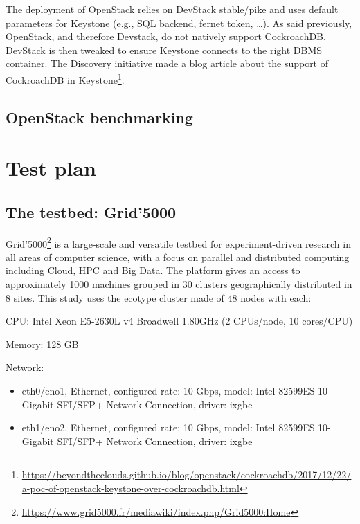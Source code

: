 The deployment of OpenStack relies on DevStack stable/pike and uses default parameters for Keystone (e.g., SQL backend, fernet token, \dots). As said previously, OpenStack, and therefore Devstack, do not natively support CockroachDB. DevStack is then tweaked to ensure Keystone connects to the right DBMS container. The Discovery initiative made a blog article about the support of CockroachDB in Keystone\footnote{\url{https://beyondtheclouds.github.io/blog/openstack/cockroachdb/2017/12/22/a-poc-of-openstack-keystone-over-cockroachdb.html}}.

\label{subsec:benchmarking}
\subsection{OpenStack benchmarking}



\label{sec:testplan}
\section{Test plan}

\subsection{The testbed: Grid'5000}
Grid’5000\footnote{\url{https://www.grid5000.fr/mediawiki/index.php/Grid5000:Home}} is a large-scale and versatile testbed for experiment-driven research in all areas of computer science, with a focus on parallel and distributed computing including Cloud, HPC and Big Data. The platform gives an access to approximately 1000 machines grouped in 30 clusters geographically distributed in 8 sites. This study uses the ecotype cluster made of 48 nodes with each:

\begin{description}
    \item{CPU:} Intel Xeon E5-2630L v4 Broadwell 1.80GHz (2 CPUs/node, 10 cores/CPU)
    \item{Memory:} 128 GB
    \item{Network:}      \begin{itemize}
        \item eth0/eno1, Ethernet, configured rate: 10 Gbps, model: Intel 82599ES 10-Gigabit SFI/SFP+ Network Connection, driver: ixgbe
        \item eth1/eno2, Ethernet, configured rate: 10 Gbps, model: Intel 82599ES 10-Gigabit SFI/SFP+ Network Connection, driver: ixgbe
      \end{itemize}
\end{description}


